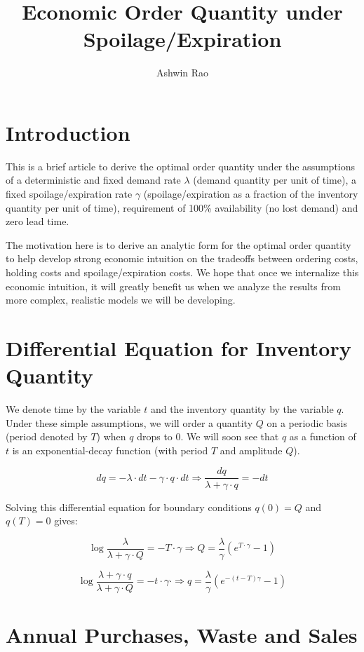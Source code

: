 \documentclass[11pt, oneside]{article}   	%
\title{Economic Order Quantity under Spoilage/Expiration}
\author{Ashwin Rao}
\date{}							%
\begin{document}
\maketitle

\section{Introduction}

This is a brief article to derive the optimal order quantity under the assumptions of a deterministic and fixed demand rate $\lambda$ (demand quantity per unit of time), a fixed spoilage/expiration rate $\gamma$  (spoilage/expiration as a fraction of the inventory quantity per unit of time), requirement of 100\% availability (no lost demand) and zero lead time.

The motivation here is to derive an analytic form for the optimal order quantity to help develop strong economic intuition on the tradeoffs between ordering costs, holding costs and spoilage/expiration costs. We hope that once we internalize this economic intuition, it will greatly benefit us when we analyze the results from more complex, realistic models we will be developing.

\section{Differential Equation for Inventory Quantity}

We denote time by the variable $t$ and the inventory quantity by the variable $q$. Under these simple assumptions, we will order a quantity $Q$ on a periodic basis (period denoted by $T$) when $q$ drops to 0. We will soon see that $q$ as a function of $t$ is an exponential-decay function (with period $T$ and amplitude $Q$).

$$dq = - \lambda \cdot dt - \gamma \cdot q \cdot dt \Rightarrow \frac {dq} {\lambda + \gamma \cdot q} = - dt$$

Solving this differential equation for boundary conditions $q(0) = Q$ and $q(T) = 0$ gives:

$$\log \frac {\lambda} {\lambda + \gamma \cdot Q} = -T \cdot \gamma \Rightarrow Q = \frac {\lambda} {\gamma} (e^{T \cdot \gamma} - 1)$$

$$\log \frac {\lambda + \gamma \cdot q} {\lambda + \gamma \cdot Q} = -t \cdot \gamma \cdot \Rightarrow q = \frac {\lambda} {\gamma} (e^{-(t-T) \gamma} - 1)$$

\section{Annual Purchases, Waste and Sales}
\end{document}
